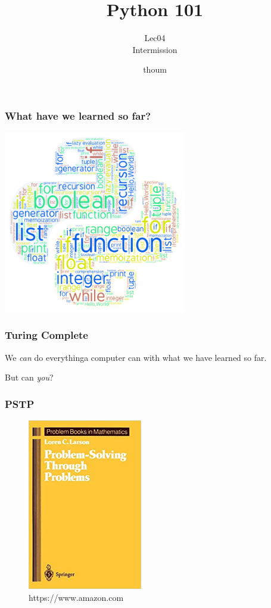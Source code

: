 \documentclass{beamer}
\title{Python 101}
\subtitle{Lec04 \\ Intermission}
\author{thoum}
\begin{document}
\frame{\titlepage}

\begin{frame}
\frametitle{What have we learned so far?}
  \begin{center}
  \includegraphics[width=80mm]{./python_art.png}
  \end{center}
\end{frame}

\begin{frame}
\frametitle{Turing Complete}
  We \textit{can} do everything\tiny{a computer can} \normalsize with what we have learned so far.
  
  But can \textit{you}?
\end{frame}

\begin{frame}
\frametitle{PSTP}
\begin{figure}
  \begin{center}
  \includegraphics[width=50mm]{./cover.jpg}
  \caption*{https://www.amazon.com}
  \end{center}
\end{figure}
\end{frame}
\end{document}
